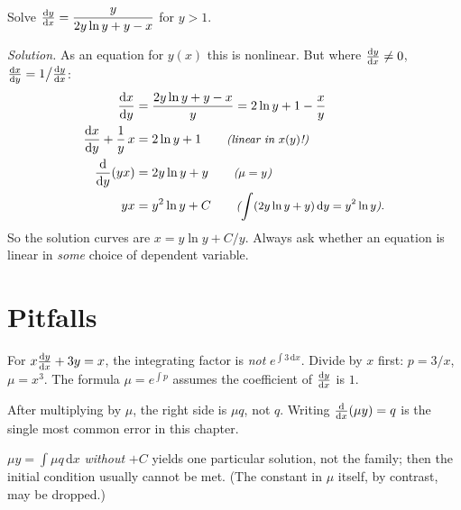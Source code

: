 \begin{example}\label{ex:ch04-swap}
Solve $\frac{\mathrm{d}y}{\mathrm{d}x} = \dfrac{y}{2y\ln y + y - x}$ for $y>1$.

\emph{Solution.}  As an equation for $y(x)$ this is nonlinear. But
where $\frac{\mathrm{d}y}{\mathrm{d}x}\neq0$, $\frac{\mathrm{d}x}{\mathrm{d}y} = 1\big/\frac{\mathrm{d}y}{\mathrm{d}x}$:
\begin{align*}
  \frac{\mathrm{d}x}{\mathrm{d}y} &= \frac{2y\ln y + y - x}{y} = 2\ln y + 1 - \frac{x}{y}\\
  \frac{\mathrm{d}x}{\mathrm{d}y} + \frac1y\,x &= 2\ln y + 1 \qquad\text{\small\itshape(linear in $x(y)$!)}\\
  \frac{\mathrm{d}}{\mathrm{d}y}(yx) &= 2y\ln y + y \qquad\text{\small\itshape($\mu = y$)}\\
  yx &= y^2\ln y + C \qquad\text{\small\itshape($\int(2y\ln y + y)\,\mathrm{d}y = y^2\ln y$)}.
\end{align*}
So the solution curves are $x = y\ln y + C/y$. Always ask whether an equation
is linear in \emph{some} choice of dependent variable.
\end{example}

\section{Pitfalls}\label{sec:ch04-pitfalls}

\begin{pitfall}\label{pit:ch04-standard}
For $x\frac{\mathrm{d}y}{\mathrm{d}x} + 3y = x$, the integrating factor is \emph{not} $e^{\int3\,\mathrm{d}x}$.
Divide by $x$ first: $p = 3/x$, $\mu = x^3$. The formula $\mu = e^{\int p}$
assumes the coefficient of $\frac{\mathrm{d}y}{\mathrm{d}x}$ is $1$.
\end{pitfall}

\begin{pitfall}\label{pit:ch04-rhs}
After multiplying by $\mu$, the right side is $\mu q$, not $q$. Writing
$\frac{\mathrm{d}}{\mathrm{d}x}(\mu y) = q$ is the single most common error in this chapter.
\end{pitfall}

\begin{pitfall}\label{pit:ch04-constant}
$\mu y = \int\mu q\,\mathrm{d}x$ \emph{without} $+C$ yields one particular
solution, not the family; then the initial condition usually cannot be met.
(The constant in $\mu$ itself, by contrast, may be dropped.)
\end{pitfall}

